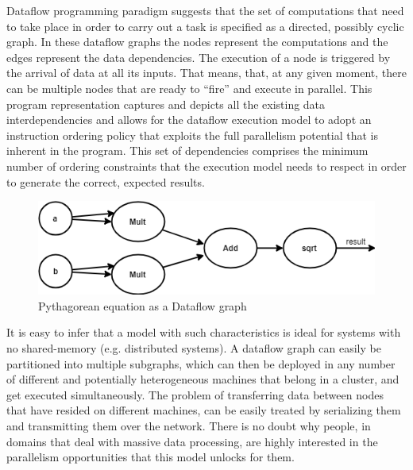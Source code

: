 \documentclass[ack,preface]{dithesis}
\begin{document}
Dataflow programming paradigm suggests that the set of computations that need to take place in order to carry out a task is specified as a directed, possibly cyclic graph. In these dataflow graphs the nodes represent the computations and the edges represent the data dependencies. The execution of a node is triggered by the arrival of data at all its inputs. That means, that, at any given moment, there can be multiple nodes that are ready to “fire” and execute in parallel. This program representation captures and depicts all the existing data interdependencies and allows for the dataflow execution model to adopt an instruction ordering policy that exploits the full parallelism potential that is inherent in the program. This set of dependencies comprises the minimum number of ordering constraints that the execution model needs to respect in order to generate the correct, expected results.

\begin{figure}
\centering
\includegraphics[scale=0.7]{figures/dataflowExample}
\caption{ Pythagorean equation as a Dataflow graph}
\end{figure}

It is easy to infer that a model with such characteristics is ideal for systems with no shared-memory (e.g. distributed systems). A dataflow graph can easily be partitioned into multiple subgraphs, which can then be deployed in any number of different and potentially heterogeneous machines that belong in a cluster, and get executed simultaneously. The problem of transferring data between nodes that have resided on different machines, can be easily treated by serializing them and transmitting them over the network.
There is no doubt why people, in domains that deal with massive data processing, are highly interested in the parallelism opportunities that this model unlocks for them. \\
\linebreak\linebreak\linebreak\linebreak\linebreak\linebreak
\end{document}
